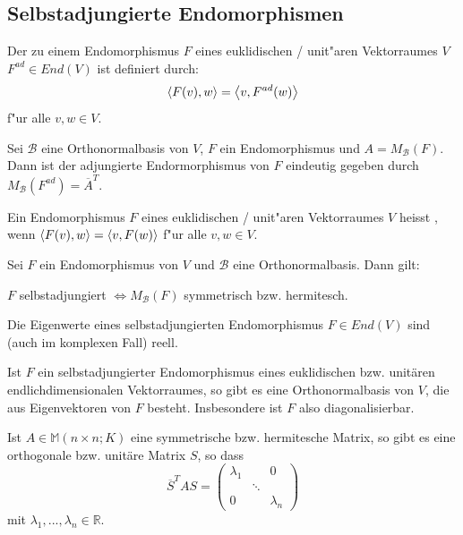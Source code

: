 \documentclass[11pt, a4paper]{article}
\begin{document}
\subsection{Selbstadjungierte Endomorphismen}


\begin{definition}
Der zu einem Endomorphismus $F$ eines euklidischen / unit"aren Vektorraumes $V$  $F^{ad} \in End(V)$ ist definiert durch:
$$
\left\langle {F(v)} , {w} \right\rangle = \left\langle {v} , {F^{ad}(w)} \right\rangle
$$
f"ur alle $v, w \in V$.
\end{definition}

\begin{remark}
Sei $\mathcal{B}$ eine Orthonormalbasis von $V$, $F$ ein Endomorphismus und $A = M_\mathcal{B}(F)$. Dann ist der adjungierte Endormorphismus von $F$ eindeutig gegeben durch $M_\mathcal{B}(F^{ad}) = \overline{A}^T$.
\end{remark}

\begin{definition}
Ein Endomorphismus $F$ eines euklidischen / unit"aren Vektorraumes $V$ heisst , wenn $\left\langle {F(v)} , {w} \right\rangle = \left\langle {v} , {F(w)} \right\rangle$ f"ur alle $v, w \in V$.
\end{definition}

\begin{theorem}
Sei $F$ ein Endomorphismus von \(V\) und \(\mathcal{B}\) eine Orthonormalbasis. Dann gilt: 

\(F\) selbstadjungiert $\Leftrightarrow M_{\mathcal{B}}(F)$ symmetrisch bzw. hermitesch.
\end{theorem}

\begin{lemma}
Die Eigenwerte eines selbstadjungierten Endomorphismus $F \in End(V)$ sind (auch im komplexen Fall) reell. 
\end{lemma}

\begin{theorem}
Ist \(F\) ein selbstadjungierter Endomorphismus eines euklidischen bzw. unitären endlichdimensionalen Vektorraumes, so gibt es eine Orthonormalbasis von \(V\), die aus Eigenvektoren von \(F\) besteht. Insbesondere ist $F$ also diagonalisierbar.
\end{theorem}

\begin{theorem}
Ist \(A \in \mathbb{M}(n \times n ; K)\) eine symmetrische bzw. hermitesche Matrix, so
gibt es eine orthogonale bzw. unitäre Matrix $S$, so dass
$$
\overline{S}^T A S = 
\left(\begin{array}{ccc}\lambda_{1} & & 0 
\\ & \ddots & 
\\ 0 & & \lambda_{n}\end{array}\right)
$$
mit $\lambda_1, ..., \lambda_n \in \mathbb{R}$.
\end{theorem}
\end{document}
